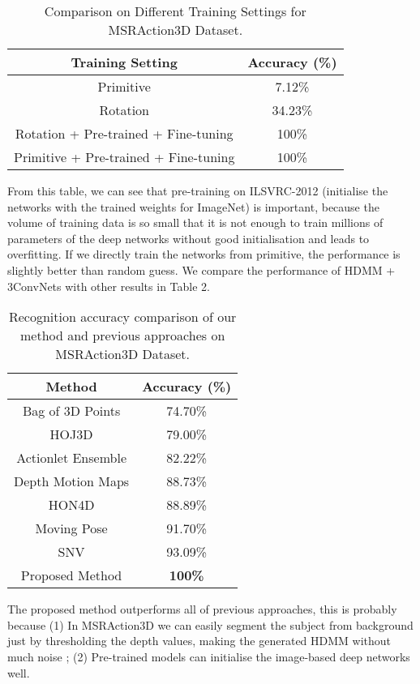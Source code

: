 \documentclass[conference]{IEEEtran}
\begin{document}
\begin{table}[h]
\centering
\caption{Comparison on Different Training Settings for MSRAction3D Dataset.}
\begin{tabular}{|c|c|}
\hline
Training Setting & Accuracy (\%)\\
\hline
Primitive & 7.12\%  \\
\hline
Rotation &34.23\%\\
\hline
Rotation + Pre-trained + Fine-tuning & 100\%  \\
\hline
Primitive + Pre-trained + Fine-tuning & 100\%  \\
\hline
\end{tabular}
\end{table}
From this table, we can see that pre-training on ILSVRC-2012 (initialise the networks with the trained weights for ImageNet) is important, because the volume of training data is so small that it is not enough to train millions of parameters of the deep networks without good initialisation and leads to overfitting. If we directly train the networks from primitive, the performance is slightly better than random guess.
We compare the performance of HDMM + 3ConvNets with other results in Table 2.

\begin{table}[h]
\centering
\caption{Recognition accuracy comparison of our method and previous approaches on MSRAction3D Dataset.}
\begin{tabular}{|c|c|}
\hline
Method & Accuracy (\%)\\
\hline
Bag of 3D Points \cite{Li2010} & 74.70\%  \\
\hline
HOJ3D \cite{xia2012view} & 79.00\%\\
\hline
Actionlet Ensemble \cite{wang2012mining} & 82.22\%  \\
\hline
Depth Motion Maps \cite{Yang2012a} & 88.73\%  \\
\hline
HON4D \cite{wang2012mining} & 88.89\%  \\
\hline
Moving Pose \cite{zanfir2013moving} & 91.70\%  \\
\hline
SNV \cite{yangsuper} & 93.09\%  \\
\hline
Proposed Method & \textbf{100\%}  \\
\hline
\end{tabular}
\end{table}

The proposed method outperforms all of previous approaches, this is probably because (1) In MSRAction3D we can easily segment the subject from background just by thresholding the depth values, making the generated HDMM without much noise ; (2) Pre-trained models can initialise the image-based deep networks well.
\end{document}
